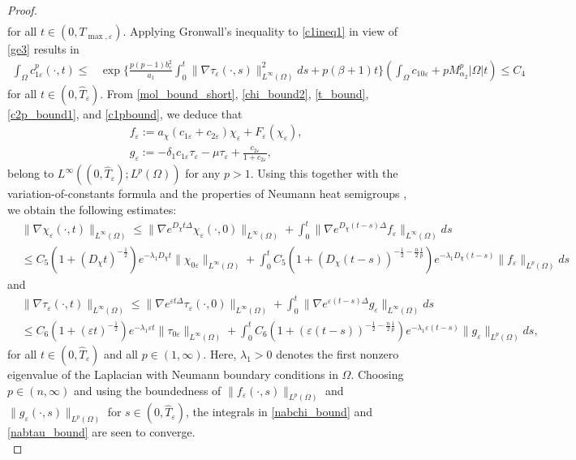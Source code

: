 \documentclass[a4paper,10pt]{article}
\theoremstyle{definition}
\begin{document}
\begin{proof}
\begin{align}
\end{align}
for all $t \in (0, T_{\max, \varepsilon})$. Applying Gronwall's inequality to \eqref{c1ineq1} in view of \eqref{ge3} results in
\begin{align}
  \label{c1pbound}
  \int_\Omega c^p_{1\varepsilon}(\cdot, t) \leq & \exp\bigg\{\frac{p(p - 1)b_\tau^2}{a_1} \int_0^t \|\nabla \tau_\varepsilon(\cdot, s)\|_{L^\infty(\Omega)}^2 ds  + p(\beta + 1)t\bigg\} \left(\int_\Omega c_{10\varepsilon} + p M_{\alpha_2}^p |\Omega| t\right) \leq C_4
\end{align}
for all $t \in (0, \widehat{T}_\varepsilon)$. From \eqref{mol_bound_short}, \eqref{chi_bound2}, \eqref{t_bound}, \eqref{c2p_bound1}, and \eqref{c1pbound}, we deduce that
\begin{align*}
& f_\varepsilon := a_\chi (c_{1 \varepsilon} + c_{2 \varepsilon}) \chi_\varepsilon + F_\varepsilon(\chi_\varepsilon), \\[5pt]
& g_\varepsilon := - \delta_1 c_{1\varepsilon} \tau_\varepsilon - \mu \tau_\varepsilon + \tfrac{c_{2\varepsilon}}{1 + c_{2\varepsilon}},
\end{align*}
belong to $L^\infty((0, \widehat{T}_\varepsilon); L^p(\Omega))$ for any $p > 1$. Using this together with the variation-of-constants formula and the properties of Neumann heat semigroups \cite[Lemma 1.3]{winkler2010aggregation}, we obtain the following estimates:
\begin{align}
\label{nabchi_bound}
  \nonumber & \|\nabla \chi_\varepsilon(\cdot, t)\|_{L^\infty(\Omega)} \leq \|\nabla e^{D_\chi t \Delta}\chi_\varepsilon(\cdot, 0)\|_{L^\infty(\Omega)} + \int_0^t \| \nabla e^{D_\chi (t - s)\Delta }f_\varepsilon  \|_{L^\infty(\Omega)}ds\\
    & \leq C_5(1 + (D_\chi t)^{-\frac{1}{2}})e^{-\lambda_1 D_\chi t} \|\chi_{0\varepsilon}\|_{L^\infty(\Omega)}
   + \int_0^t C_5(1 + (D_\chi (t - s))^{-\frac{1}{2} - \frac{n}{2}\frac{1}{p}})e^{- \lambda_1 D_\chi(t - s)}\|f_\varepsilon \|_{L^p(\Omega)}ds
\end{align}
and
\begin{align}
\label{nabtau_bound}
  \nonumber & \|\nabla \tau_\varepsilon(\cdot, t)\|_{L^\infty(\Omega)} \leq \|\nabla e^{\varepsilon t \Delta}\tau_\varepsilon(\cdot, 0)\|_{L^\infty(\Omega)} + \int_0^t \| \nabla e^{\varepsilon (t - s)\Delta }g_\varepsilon  \|_{L^\infty(\Omega)}ds\\
    & \leq C_6(1 + (\varepsilon t)^{-\frac{1}{2}})e^{-\lambda_1 \varepsilon t} \|\tau_{0\varepsilon}\|_{L^\infty(\Omega)}
   + \int_0^t C_6(1 + (\varepsilon (t - s))^{-\frac{1}{2} - \frac{n}{2}\frac{1}{p}})e^{- \lambda_1 \varepsilon (t - s)}\|g_\varepsilon \|_{L^p(\Omega)}ds,
\end{align}
for all $t \in (0, \widehat{T}_{\varepsilon})$ and all $p \in (1, \infty)$. Here, $\lambda_1 > 0$ denotes the first nonzero eigenvalue of the Laplacian with Neumann boundary conditions in $\Omega$. Choosing $p \in (n, \infty)$ and using the boundedness of $\|f_\varepsilon(\cdot, s)\|_{L^p(\Omega)}$ and $\|g_\varepsilon(\cdot, s)\|_{L^p(\Omega)}$ for $s \in (0, \widehat{T}_\varepsilon)$, the integrals in \eqref{nabchi_bound} and \eqref{nabtau_bound} are seen to converge.\\[-1ex]


\end{proof}
\end{document}
